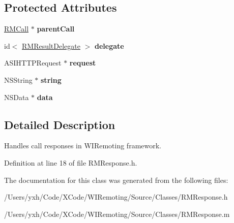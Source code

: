 \subsection*{Protected Attributes}
\begin{DoxyCompactItemize}
\item 
\hypertarget{interface_r_m_response_aead684dffc01908a30b52a9fec734939}{
\hyperlink{interface_r_m_call}{RMCall} $\ast$ {\bfseries parentCall}}
\label{interface_r_m_response_aead684dffc01908a30b52a9fec734939}

\item 
\hypertarget{interface_r_m_response_a99df96e18e793bbd99aa1d2cce3e2e6f}{
id$<$ \hyperlink{protocol_r_m_result_delegate-p}{RMResultDelegate} $>$ {\bfseries delegate}}
\label{interface_r_m_response_a99df96e18e793bbd99aa1d2cce3e2e6f}

\item 
\hypertarget{interface_r_m_response_a8100e3ff4d7ad1ec1707c763a8690ff4}{
ASIHTTPRequest $\ast$ {\bfseries request}}
\label{interface_r_m_response_a8100e3ff4d7ad1ec1707c763a8690ff4}

\item 
\hypertarget{interface_r_m_response_a8a916fbec7712a005e611b7f5e4f4bdf}{
NSString $\ast$ {\bfseries string}}
\label{interface_r_m_response_a8a916fbec7712a005e611b7f5e4f4bdf}

\item 
\hypertarget{interface_r_m_response_a420513833840b50a963a6a1c2f02b975}{
NSData $\ast$ {\bfseries data}}
\label{interface_r_m_response_a420513833840b50a963a6a1c2f02b975}

\end{DoxyCompactItemize}


\subsection{Detailed Description}
Handles call responses in WIRemoting framework. 

Definition at line 18 of file RMResponse.h.

The documentation for this class was generated from the following files:\begin{DoxyCompactItemize}
\item 
/Users/yxh/Code/XCode/WIRemoting/Source/Classes/RMResponse.h\item 
/Users/yxh/Code/XCode/WIRemoting/Source/Classes/RMResponse.m\end{DoxyCompactItemize}
